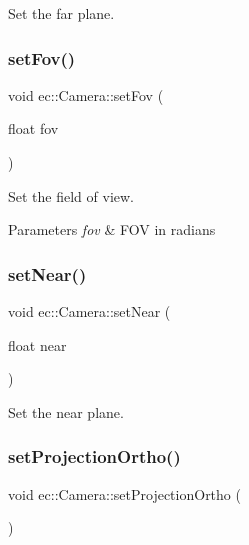 Set the far plane. 

\mbox{\label{classec_1_1_camera_a1003feebe7df69a508f684c1c67f1388}} 
\subsubsection{\texorpdfstring{set\+Fov()}{setFov()}}
{\footnotesize\ttfamily void ec\+::\+Camera\+::set\+Fov (\begin{DoxyParamCaption}\item[{float}]{fov }\end{DoxyParamCaption})}

Set the field of view. 
\begin{DoxyParams}{Parameters}
{\em fov} & F\+OV in radians \\
\hline
\end{DoxyParams}
\mbox{\label{classec_1_1_camera_af0c1f82f4cb2aeb3908b858093080556}} 
\subsubsection{\texorpdfstring{set\+Near()}{setNear()}}
{\footnotesize\ttfamily void ec\+::\+Camera\+::set\+Near (\begin{DoxyParamCaption}\item[{float}]{near }\end{DoxyParamCaption})}



Set the near plane. 

\mbox{\label{classec_1_1_camera_ae36280401efe1d0f5bef9997952f8814}} 
\subsubsection{\texorpdfstring{set\+Projection\+Ortho()}{setProjectionOrtho()}}
{\footnotesize\ttfamily void ec\+::\+Camera\+::set\+Projection\+Ortho (\begin{DoxyParamCaption}{ }\end{DoxyParamCaption})}




